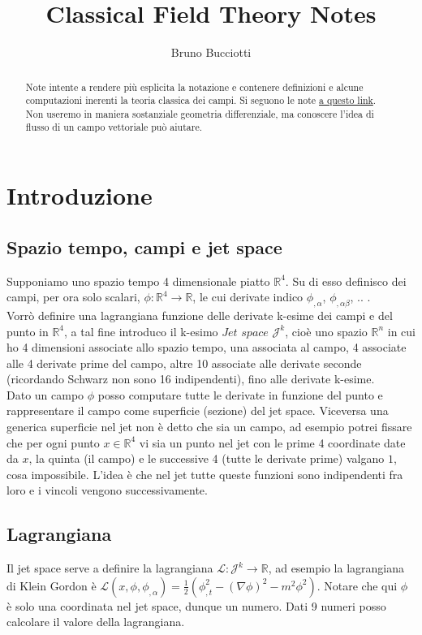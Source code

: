 \documentclass[]{article}
\title{Classical Field Theory Notes}
\author{Bruno Bucciotti}
\newcommand{\al}{\alpha}
\begin{document}
\maketitle

\begin{abstract}
Note intente a rendere più esplicita la notazione e contenere definizioni e alcune computazioni inerenti la teoria classica dei campi. Si seguono le note \href{https://digitalcommons.usu.edu/cgi/viewcontent.cgi?article=1002&context=lib_mono}{a questo link}. Non useremo in maniera sostanziale geometria differenziale, ma conoscere l'idea di flusso di un campo vettoriale può aiutare.
\end{abstract}

\section*{Introduzione}
\subsection*{Spazio tempo, campi e jet space}
Supponiamo uno spazio tempo 4 dimensionale piatto $\mathbb{R}^4$. Su di esso definisco dei campi, per ora solo scalari, $\phi : \mathbb{R}^4 \rightarrow \mathbb{R}$, le cui derivate indico $\phi_{,\al}$, $\phi_{,\al\beta}$, .. .\\
Vorrò definire una lagrangiana funzione delle derivate k-esime dei campi e del punto in $\mathbb{R}^4$, a tal fine introduco il k-esimo $Jet$ $space$ $\mathcal{J}^k$, cioè uno spazio $\mathbb{R}^n$ in cui ho 4 dimensioni associate allo spazio tempo, una associata al campo, 4 associate alle 4 derivate prime del campo, altre 10 associate alle derivate seconde (ricordando Schwarz non sono 16 indipendenti), fino alle derivate k-esime.\\
Dato un campo $\phi$ posso computare tutte le derivate in funzione del punto e rappresentare il campo come superficie (sezione) del jet space. Viceversa una generica superficie nel jet non è detto che sia un campo, ad esempio potrei fissare che per ogni punto $x\in \mathbb{R}^4$ vi sia un punto nel jet con le prime 4 coordinate date da $x$, la quinta (il campo) e le successive 4 (tutte le derivate prime) valgano $1$, cosa impossibile. L'idea è che nel jet tutte queste funzioni sono indipendenti fra loro e i vincoli vengono successivamente.
\subsection*{Lagrangiana}
Il jet space serve a definire la lagrangiana $\mathcal{L} : \mathcal{J}^k \rightarrow \mathbb{R}$, ad esempio la lagrangiana di Klein Gordon è $\mathcal{L} (x, \phi, \phi_{,\al}) = \frac{1}{2} (\phi_{,t}^2 - (\nabla \phi)^2 - m^2 \phi^2)$. Notare che qui $\phi$ è solo una coordinata nel jet space, dunque un numero. Dati 9 numeri posso calcolare il valore della lagrangiana.
\end{document}

